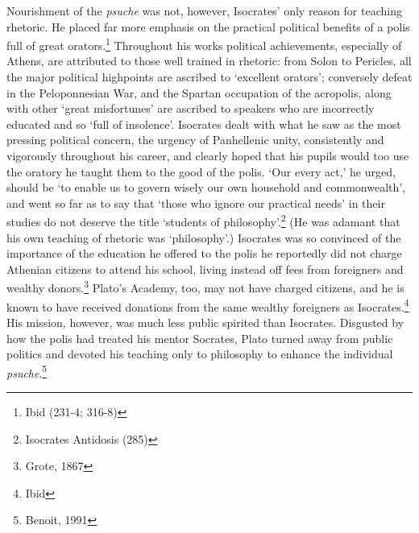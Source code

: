 \begin{multicols}{2}
Nourishment of the \emph{psuche} was not, however, Isocrates' only
reason for teaching rhetoric. He placed far more emphasis on the
practical political benefits of a polis full of great orators.\footnote{\textsuperscript{}
	Ibid (231-4; 316-8)} Throughout his works political achievements,
especially of Athens, are attributed to those well trained in rhetoric:
from Solon to Pericles, all the major political highpoints are ascribed
to `excellent orators'; conversely defeat in the Peloponnesian War, and
the Spartan occupation of the acropolis, along with other `great
misfortunes' are ascribed to speakers who are incorrectly educated and
so `full of insolence'. Isocrates dealt with what he saw as the most
pressing political concern, the urgency of Panhellenic unity,
consistently and vigorously throughout his career, and clearly hoped
that his pupils would too use the oratory he taught them to the good of
the polis. `Our every act,' he urged, should be `to enable us to govern
wisely our own household and commonwealth', and went so far as to say
that `those who ignore our practical needs' in their studies do not
deserve the title `students of philosophy'.\footnote{\textsuperscript{}
	Isocrates Antidosis (285)} (He was adamant that his own teaching of
rhetoric was `philosophy'.) Isocrates was so convinced of the importance
of the education he offered to the polis he reportedly did not charge
Athenian citizens to attend his school, living instead off fees from
foreigners and wealthy donors.\footnote{\textsuperscript{} Grote, 1867}
Plato's Academy, too, may not have charged citizens, and he is known to
have received donations from the same wealthy foreigners as
Isocrates.\footnote{\textsuperscript{} Ibid} His mission, however, was
much less public spirited than Isocrates. Disgusted by how the polis had
treated his mentor Socrates, Plato turned away from public politics and
devoted his teaching only to philosophy to enhance the individual
\emph{psuche}.\footnote{\textsuperscript{} Benoit, 1991}


\end{multicols}
